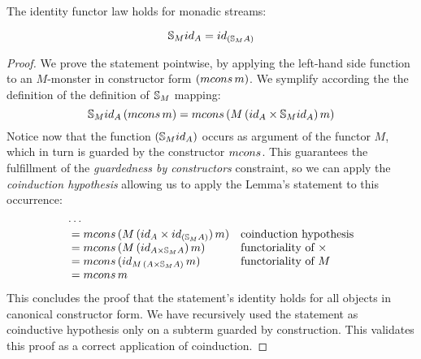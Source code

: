 \begin{lemma}\label{lemma:functor_id}
The identity functor law holds for monadic streams:

$$
\stream{M} \id_A = \id_{(\stream{M} A)}
$$

\end{lemma}
\begin{proof}
We prove the statement pointwise, by applying the left-hand side function to an $M$-monster in constructor form $(\mcons\,m)$.
We symplify according the the definition of the definition of $\mathbb{S}_{M}$ mapping:
$$
\stream{M} \id_A\,(\mcons\,m)
= \mcons\,(M\,(\id_A\times \stream{M} \id_A)\,m)
$$
Notice now that the function $(\stream{M} \id_A)$ occurs as argument of the functor $M$, which in turn is guarded by the constructor $\mcons$.
This guarantees the fulfillment of the {\em guardedness by constructors} constraint, so we can apply the {\em coinduction hypothesis} allowing us to apply the Lemma's statement to this occurrence:
$$
\begin{array}{ll}
\cdots\\
{}= \mcons\,(M\,(\id_A\times \id_{(\stream{M} A)})\,m)
  & \mbox{coinduction hypothesis}\\
{}= \mcons\,(M\,(\id_{A\times \stream{M} A})\,m)
  & \mbox{functoriality of }\times\\
{}= \mcons\,(\id_{M\,(A\times \stream{M} A)}\,m)
  & \mbox{functoriality of }M\\
{}= \mcons\,m
\end{array}
$$
This concludes the proof that the statement's identity holds for all objects in canonical constructor form.
We have recursively used the statement as coinductive hypothesis only on a subterm guarded by construction.
This validates this proof as a correct application of coinduction.
\end{proof}

